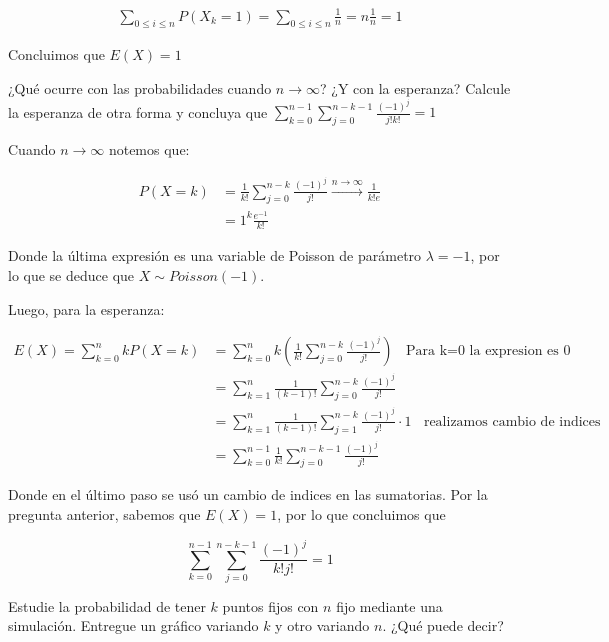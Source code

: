 \documentclass[letterpaper,10pt,table, dvipsnames]{article}
\begin{document}
\begin{align*}
     \sum_{0 \leq i \leq n}^{} P(X_k = 1) = \sum_{0 \leq i \leq n}^{} \frac{1}{n} = n \frac{1}{n} = 1 
 \end{align*} 

 Concluimos que $E(X) = 1$

\newpage

\begin{tcolorbox}
  ¿Qué ocurre con las probabilidades cuando $n \rightarrow \infty$? ¿Y con la esperanza? Calcule la esperanza de otra forma y concluya que $\sum\limits_{k=0}^{n-1}\sum_{j=0}^{n-k-1} \frac{(-1)^j}{j!k!}=1 $
\end{tcolorbox}

Cuando $n \rightarrow \infty $ notemos que:

\begin{align*}
    P(X=k) &= \frac{1}{k!} \sum_{j=0}^{n-k} \frac{(-1)^j}{j!} \xrightarrow[]{n \rightarrow \infty} \frac{1}{k! e} \\
    &= 1^k \frac{e^{-1}}{k!} 
\end{align*}

Donde la última expresión es una variable de Poisson de parámetro $\lambda=-1$, por lo que se deduce que $X\sim Poisson(-1) $.

Luego, para la esperanza:

\begin{align*}
     E(X) = \sum_{k=0}^{n} k P(X=k) &= \sum_{k=0}^{n} k \left(\frac{1}{k!} \sum_{j=0}^{n-k} \frac{(-1)^j}{j!}\right) \ \ \ \ \textrm{Para k=0 la expresion es 0} \\
     &= \sum_{k=1}^{n} \frac{1}{(k-1)!} \sum_{j=0}^{n-k} \frac{(-1)^j}{j!} \\
     &= \sum_{k=1}^{n} \frac{1}{(k-1)!} \sum_{j=1}^{n-k} \frac{(-1)^j}{j!} \cdot 1 \ \ \ \ \textrm{realizamos cambio de indices} \\
     &= \sum_{k=0}^{n-1} \frac{1}{k!} \sum_{j=0}^{n-k-1} \frac{(-1)^j}{j!}
 \end{align*} 

Donde en el último paso se usó un cambio de indices en las sumatorias. Por la pregunta anterior, sabemos que $E(X) = 1$, por lo que concluimos que 


\begin{equation*}
  \sum_{k=0}^{n-1}\sum_{j=0}^{n-k-1} \frac{(-1)^j}{k!j!} = 1
\end{equation*}


\begin{tcolorbox}
 Estudie la probabilidad de tener $k$ puntos fijos con $n$ fijo mediante una simulación. Entregue un gráfico variando $k$ y otro variando $n$. ¿Qué puede decir?
\end{tcolorbox}
\end{document}

